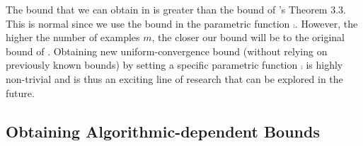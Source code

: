 \documentclass[twoside]{article}
\theoremstyle{plain}
\begin{document}
The bound that we can obtain in  is greater than the bound of \citet{mohri2012foundations}'s Theorem 3.3.
This is normal since we use the bound in the parametric function $\comp$.
However, the higher the number of examples $m$, the closer our bound will be to the original bound of \citet{mohri2012foundations}.
Obtaining new uniform-convergence bound (without relying on previously known bounds) by setting a specific parametric function $\comp$ is highly non-trivial and is thus an exciting line of research that can be explored in the future.

\subsection{Obtaining Algorithmic-dependent Bounds}
\label{sec:obtaining-algo}
\end{document}
